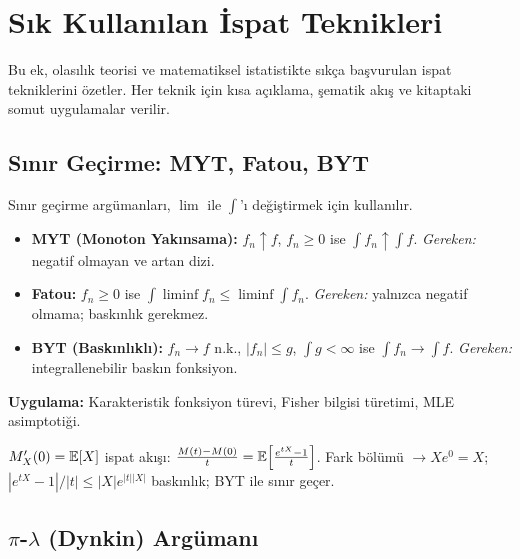 \chapter{Sık Kullanılan İspat Teknikleri}
\label{app:ispat_teknikleri}

Bu ek, olasılık teorisi ve matematiksel istatistikte sıkça başvurulan ispat tekniklerini özetler. Her teknik için kısa açıklama, şematik akış ve kitaptaki somut uygulamalar verilir.

\section{Sınır Geçirme: MYT, Fatou, BYT}
\label{app:sinir_gecirme}

Sınır geçirme argümanları, $\lim$ ile $\int$'ı değiştirmek için kullanılır.

\begin{itemize}
  \item \textbf{MYT (Monoton Yakınsama):} $f_n\uparrow f$, $f_n\geq0$ ise $\int f_n\uparrow\int f$.
    \textit{Gereken:} negatif olmayan ve artan dizi.
  \item \textbf{Fatou:} $f_n\geq0$ ise $\int\liminf f_n\leq\liminf\int f_n$.
    \textit{Gereken:} yalnızca negatif olmama; baskınlık gerekmez.
  \item \textbf{BYT (Baskınlıklı):} $f_n\to f$ n.k., $|f_n|\leq g$, $\int g<\infty$ ise $\int f_n\to\int f$.
    \textit{Gereken:} integrallenebilir baskın fonksiyon.
\end{itemize}

\noindent\textbf{Uygulama:} Karakteristik fonksiyon türevi, Fisher bilgisi türetimi, MLE asimptotiği.

\begin{ornek}
$M_X'(0) = \mathbb{E}[X]$ ispat akışı: $\frac{M(t)-M(0)}{t}=\mathbb{E}\!\left[\frac{e^{tX}-1}{t}\right]$. Fark bölümü $\to Xe^{0}=X$; $|e^{tX}-1|/|t|\leq|X|e^{|t||X|}$ baskınlık; BYT ile sınır geçer.
\end{ornek}

\section{$\pi$-$\lambda$ (Dynkin) Argümanı}
\label{app:pi_lambda}

